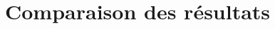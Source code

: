 \documentclass[11pt,a4paper]{article}
\begin{document}
\section{Comparaison des résultats}

























\end{document}

